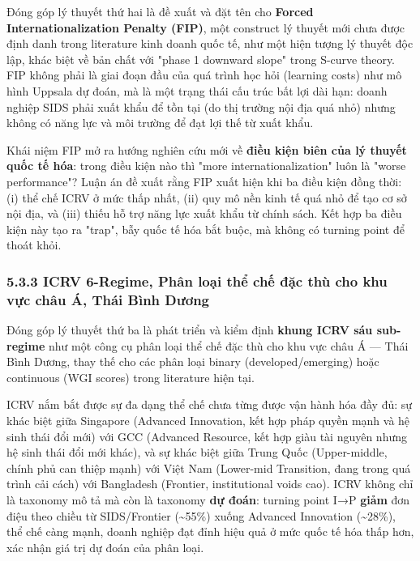 \documentclass[12pt,a4paper]{article}
\begin{document}
Đóng góp lý thuyết thứ hai là đề xuất và đặt tên cho \textbf{Forced
Internationalization Penalty (FIP)}, một construct lý thuyết mới chưa
được định danh trong literature kinh doanh quốc tế, như một hiện tượng
lý thuyết độc lập, khác biệt về bản chất với "phase 1 downward slope"
trong S-curve theory. FIP không phải là giai đoạn đầu của quá trình học
hỏi (learning costs) như mô hình Uppsala dự đoán, mà là một trạng thái
cấu trúc bất lợi dài hạn: doanh nghiệp SIDS phải xuất khẩu để tồn tại
(do thị trường nội địa quá nhỏ) nhưng không có năng lực và môi trường để
đạt lợi thế từ xuất khẩu.

Khái niệm FIP mở ra hướng nghiên cứu mới về \textbf{điều kiện biên của
lý thuyết quốc tế hóa}: trong điều kiện nào thì "more
internationalization" luôn là "worse performance"? Luận án đề xuất rằng
FIP xuất hiện khi ba điều kiện đồng thời: (i) thể chế ICRV ở mức thấp
nhất, (ii) quy mô nền kinh tế quá nhỏ để tạo cơ sở nội địa, và (iii)
thiếu hỗ trợ năng lực xuất khẩu từ chính sách. Kết hợp ba điều kiện này
tạo ra "trap", bẫy quốc tế hóa bắt buộc, mà không có turning point để
thoát khỏi.

\hypertarget{533-icrv-6-regime-phuxe2n-loux1ea1i-thux1ec3-chux1ebf-ux111ux1eb7c-thuxf9-cho-khu-vux1ef1c-chuxe2u-uxe1-thuxe1i-buxecnh-dux1b0ux1a1ng}{%
\subsubsection{5.3.3 ICRV 6-Regime, Phân loại thể chế đặc thù cho khu
vực châu Á, Thái Bình
Dương}\label{533-icrv-6-regime-phuxe2n-loux1ea1i-thux1ec3-chux1ebf-ux111ux1eb7c-thuxf9-cho-khu-vux1ef1c-chuxe2u-uxe1-thuxe1i-buxecnh-dux1b0ux1a1ng}}

Đóng góp lý thuyết thứ ba là phát triển và kiểm định \textbf{khung ICRV
sáu sub-regime} như một công cụ phân loại thể chế đặc thù cho khu vực
châu Á --- Thái Bình Dương, thay thế cho các phân loại binary
(developed/emerging) hoặc continuous (WGI scores) trong literature hiện
tại.

ICRV nắm bắt được sự đa dạng thể chế chưa từng được vận hành hóa đầy đủ:
sự khác biệt giữa Singapore (Advanced Innovation, kết hợp pháp quyền
mạnh và hệ sinh thái đổi mới) với GCC (Advanced Resource, kết hợp giàu
tài nguyên nhưng hệ sinh thái đổi mới khác), và sự khác biệt giữa Trung
Quốc (Upper-middle, chính phủ can thiệp mạnh) với Việt Nam (Lower-mid
Transition, đang trong quá trình cải cách) với Bangladesh (Frontier,
institutional voids cao). ICRV không chỉ là taxonomy mô tả mà còn là
taxonomy \textbf{dự đoán}: turning point I→P \textbf{giảm} đơn điệu theo
chiều từ SIDS/Frontier (\textasciitilde55\%) xuống Advanced Innovation
(\textasciitilde28\%), thể chế càng mạnh, doanh nghiệp đạt đỉnh hiệu quả
ở mức quốc tế hóa thấp hơn, xác nhận giá trị dự đoán của phân loại.
\end{document}
